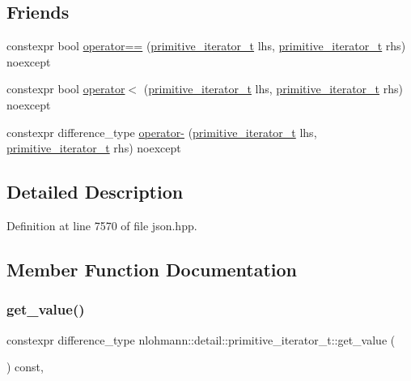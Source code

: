 \subsection*{Friends}
\begin{DoxyCompactItemize}
\item 
constexpr bool \mbox{\hyperlink{classnlohmann_1_1detail_1_1primitive__iterator__t_aae1e1e2ec0e229d1291d69de57d76bbe}{operator==}} (\mbox{\hyperlink{classnlohmann_1_1detail_1_1primitive__iterator__t}{primitive\+\_\+iterator\+\_\+t}} lhs, \mbox{\hyperlink{classnlohmann_1_1detail_1_1primitive__iterator__t}{primitive\+\_\+iterator\+\_\+t}} rhs) noexcept
\item 
constexpr bool \mbox{\hyperlink{classnlohmann_1_1detail_1_1primitive__iterator__t_a901a95e6d73c9509d3dcde914f6c8a9d}{operator$<$}} (\mbox{\hyperlink{classnlohmann_1_1detail_1_1primitive__iterator__t}{primitive\+\_\+iterator\+\_\+t}} lhs, \mbox{\hyperlink{classnlohmann_1_1detail_1_1primitive__iterator__t}{primitive\+\_\+iterator\+\_\+t}} rhs) noexcept
\item 
constexpr difference\+\_\+type \mbox{\hyperlink{classnlohmann_1_1detail_1_1primitive__iterator__t_ac6d902d6ec9a02dabed5452d3ae78f7e}{operator-\/}} (\mbox{\hyperlink{classnlohmann_1_1detail_1_1primitive__iterator__t}{primitive\+\_\+iterator\+\_\+t}} lhs, \mbox{\hyperlink{classnlohmann_1_1detail_1_1primitive__iterator__t}{primitive\+\_\+iterator\+\_\+t}} rhs) noexcept
\end{DoxyCompactItemize}


\subsection{Detailed Description}


Definition at line 7570 of file json.\+hpp.



\subsection{Member Function Documentation}
\mbox{\label{classnlohmann_1_1detail_1_1primitive__iterator__t_ae952990886ca1756229f916661a8af81}} 
\subsubsection{\texorpdfstring{get\_value()}{get\_value()}}
{\footnotesize\ttfamily constexpr difference\+\_\+type nlohmann\+::detail\+::primitive\+\_\+iterator\+\_\+t\+::get\+\_\+value (\begin{DoxyParamCaption}{ }\end{DoxyParamCaption}) const\hspace{0.3cm}{\ttfamily [inline]}, {\ttfamily [noexcept]}}




